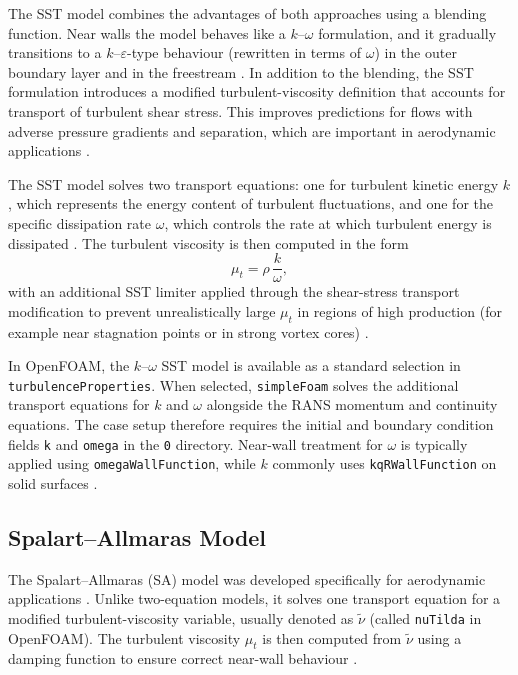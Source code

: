 The SST model combines the advantages of both approaches using a blending function. Near walls the model behaves like a $k$--$\omega$ formulation, and it gradually transitions to a $k$--$\varepsilon$-type behaviour (rewritten in terms of $\omega$) in the outer boundary layer and in the freestream \cite{Menter1994SST}. In addition to the blending, the SST formulation introduces a modified turbulent-viscosity definition that accounts for transport of turbulent shear stress. This improves predictions for flows with adverse pressure gradients and separation, which are important in aerodynamic applications \cite{Menter1994SST}.

The SST model solves two transport equations: one for turbulent kinetic energy $k$, which represents the energy content of turbulent fluctuations, and one for the specific dissipation rate $\omega$, which controls the rate at which turbulent energy is dissipated \cite{VersteegMalalasekera2007CFD,Menter1994SST}. The turbulent viscosity is then computed in the form
\begin{equation}
\mu_t = \rho \, \frac{k}{\omega},
\end{equation}
with an additional SST limiter applied through the shear-stress transport modification to prevent unrealistically large $\mu_t$ in regions of high production (for example near stagnation points or in strong vortex cores) \cite{Menter1994SST}.

In OpenFOAM, the $k$--$\omega$ SST model is available as a standard selection in \texttt{turbulenceProperties}. When selected, \texttt{simpleFoam} solves the additional transport equations for $k$ and $\omega$ alongside the RANS momentum and continuity equations. The case setup therefore requires the initial and boundary condition fields \texttt{k} and \texttt{omega} in the \texttt{0} directory. Near-wall treatment for $\omega$ is typically applied using \texttt{omegaWallFunction}, while $k$ commonly uses \texttt{kqRWallFunction} on solid surfaces \cite{VersteegMalalasekera2007CFD}.

\subsection{Spalart--Allmaras Model}
\label{sec:sa_model}

The Spalart--Allmaras (SA) model was developed specifically for aerodynamic applications \cite{SpalartAllmaras1992SA,SpalartAllmaras1994SAJournal}. Unlike two-equation models, it solves one transport equation for a modified turbulent-viscosity variable, usually denoted as $\tilde{\nu}$ (called \texttt{nuTilda} in OpenFOAM). The turbulent viscosity $\mu_t$ is then computed from $\tilde{\nu}$ using a damping function to ensure correct near-wall behaviour \cite{SpalartAllmaras1992SA,SpalartAllmaras1994SAJournal}.

